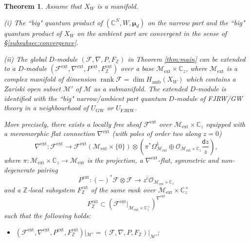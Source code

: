 \documentclass[11pt]{amsart}
\newtheorem{thm}{Theorem}[section] %
\theoremstyle{definition} %
\theoremstyle{remark} %
\newcommand{\CC}{\mathbb C}
\newcommand{\ZZ}{\mathbb Z}
\def\GW{\operatorname{\text{GW}}}
\newcommand{\bmu}{\boldsymbol{\mu}}
\newcommand{\cO}{\mathcal{O}}
\newcommand{\cM}{\mathcal{M}}
\newcommand{\cF}{\mathcal{F}}
\newcommand{\dd}{\mathsf{d}}
\newcommand{\hc}{\hat{c}}
\newcommand{\amb}{\operatorname{amb}}
\newcommand{\ext}{{\operatorname{ext}}}
\newcommand{\FJRW}{{\operatorname{FJRW}}}
\renewcommand{\GW}{{\operatorname{GW}}}
\newcommand{\rank}{\operatorname{rank}}
\begin{document}
\begin{thm} 
\label{thm:big} 
Assume that $X_W$ is a manifold. 

{\rm (i)} The ``big" quantum product of $(\CC^N,W,\bmu_d)$ 
on the narrow part 
and the ``big" quantum product of $X_W$ 
on the ambient part 
are convergent in the sense of \S \ref{subsubsec:convergence}. 

{\rm (ii)} 
The global $D$-module $(\cF,\nabla,P,F_\ZZ)$ 
in Theorem \ref{thm:main} can be extended to 
a $D$-module $(\cF^\ext,\nabla^\ext,P^\ext,F_\ZZ^\ext)$ 
over a base $\cM_\ext\times \CC_z$, 
where $\cM_\ext$ is a complex manifold 
of dimension $\rank \cF = \dim H_{\amb}(X_W)$ which contains 
a Zariski open subset $\cM'$ of $\cM$ as a 
submanifold. 
The extended $D$-module is identified 
with the ``big" narrow/ambient part quantum $D$-module 
of FJRW/GW theory in a 
neighbourhood of $U_{\GW}$ or $U_{\FJRW}$.  

More precisely, there exists a locally free sheaf 
$\cF^\ext$ over $\cM_\ext\times \CC_z $
equipped with a meromorphic flat connection $\nabla^\ext$ 
(with poles of order two along $z=0$)
\[
\nabla^\ext \colon \cF^\ext \to \cF^\ext(\cM_\ext
\times \{0\}) \otimes \left (
\pi^* \Omega_{\cM_\ext}^1 
\oplus \cO_{\cM_\ext \times \CC_z} \frac{\dd z}{z} 
\right), 
\]
where $\pi \colon \cM_\ext \times \CC_z \to \cM_\ext$ 
is the projection, 
a $\nabla^\ext$-flat, symmetric and non-degenerate 
pairing 
\[
P^\ext \colon (-)^* \cF \otimes \cF \to z^{\hc} \cO_{\cM_\ext \times \CC_z} 
\]
and a $\ZZ$-local subsystem $F^\ext_\ZZ$ of the same rank 
over $\cM_\ext \times \CC^\times_z$ 
\[
F^\ext_\ZZ \subset (\cF^\ext|_{\cM_\ext\times \CC^\times_z})^{\nabla^\ext} 
\]
such that the following holds: 
% 
% 
% 
\begin{itemize} 
\item $(\cF^\ext,\nabla^\ext, P^\ext, F_\ZZ^\ext)|_{\cM'} 
= (\cF,\nabla,P,F_\ZZ)|_{\cM'}$; 


\end{itemize}
\end{thm}
\end{document}
